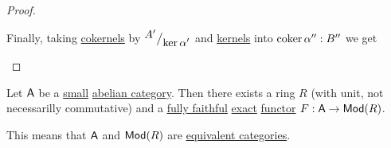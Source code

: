 \documentclass[../../../main]{subfiles}
\begin{document}
\begin{proof}
\begin{center}
  \end{center}
  Finally, taking \hyperref[def:categorical-cokernel]{cokernels} by \({^{\textstyle A'}\big/_{\textstyle \ker \alpha'}}\) and \hyperref[def:categorical-kernel]{kernels} into \(\operatorname*{coker} \alpha'':B''\) we get
  \begin{center}
  \end{center}
\end{proof}

\begin{theorem}\label{thm:freyd-mitchell}
  Let \(\mathsf{A}\) be a \hyperref[def:small-category]{small} \hyperref[def:abelian-category]{abelian category}.
  Then there exists a ring \(R\) (with unit, not necessarilly commutative) and a \hyperref[def:functor-types]{fully faithful} \hyperref[def:exact-functor]{exact} \hyperref[def:functor]{functor} \(F: \mathsf{A} \to \mathsf{Mod}(R)\).

  This means that \(\mathsf{A}\) and \(\mathsf{Mod}(R)\) are \hyperref[def:equivalent-categories]{equivalent categories}.
\end{theorem}
\end{document}
